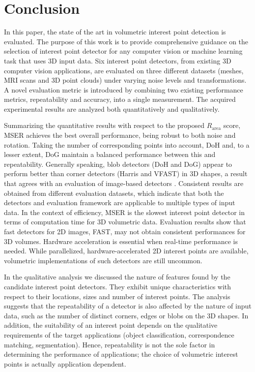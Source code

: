 


\section{Conclusion}
\label{sec/eval/conclusion}
In this paper, the state of the art in volumetric interest point detection is evaluated. The purpose of this work is to provide comprehensive guidance on the selection of interest point detector for any computer vision or machine learning task that uses 3D input data. Six interest point detectors, from existing 3D computer vision applications, are evaluated on three different datasets (meshes, MRI scans and 3D point clouds) under varying noise levels and transformations. 
A novel evaluation metric is introduced by combining two existing performance metrics, repeatability and accuracy, into a single measurement. The acquired experimental results are analyzed both quantitatively and qualitatively.


Summarizing the quantitative results with respect to the proposed $R_{\textrm{area}}$ score, MSER achieves the best overall performance, being robust to both noise and rotation. Taking the number of corresponding points into account, DoH and, to a lesser extent, DoG maintain a balanced performance between this and repeatability. Generally speaking, blob detectors (\eg DoH and DoG) appear to perform better than corner detectors (\eg Harris and VFAST) in 3D shapes, a result that agrees with an evaluation of image-based detectors \cite{Mikolajczyk2005}. Consistent results are obtained from different evaluation datasets, which indicate that both the detectors and evaluation framework are applicable to multiple types of input data. In the context of efficiency, MSER is the slowest interest point detector in terms of computation time for 3D volumetric data. Evaluation results show that fast detectors for 2D images, \eg FAST, may not obtain consistent performances for 3D volumes. Hardware acceleration is essential when real-time performance is needed. While parallelized, hardware-accelerated 2D interest points are available, volumetric implementations of such detectors are still uncommon. 

In the qualitative analysis we discussed the nature of features found by the candidate interest point detectors. They exhibit unique characteristics with respect to their locations, sizes and number of interest points. 
The analysis suggests that the repeatability of a detector is also affected by the nature of input data, such as the number of distinct corners, edges or blobs on the 3D shapes. In addition, the suitability of an interest point depends on the qualitative requirements of the target applications (\eg object classification, correspondence matching, segmentation). Hence, repeatability is not the sole factor in determining the performance of applications; the choice of volumetric interest points is actually application dependent. 
